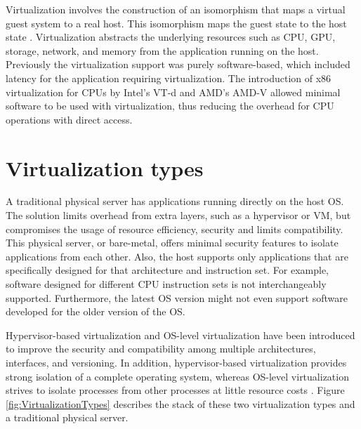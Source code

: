 Virtualization involves the construction of an isomorphism that maps a virtual guest system to a real host. This isomorphism maps the guest state to the host state \cite{Xing2012}. Virtualization abstracts the underlying resources such as CPU, GPU, storage, network, and memory from the application running on the host. Previously the virtualization support was purely software-based, which included latency for the application requiring virtualization. The introduction of x86 virtualization for CPUs by Intel's VT-d and AMD's AMD-V allowed minimal software to be used with virtualization, thus reducing the overhead for CPU operations with direct access.

\section{Virtualization types}

A traditional physical server has applications running directly on the host OS. The solution limits overhead from extra layers, such as a hypervisor or VM, but compromises the usage of resource efficiency, security and limits compatibility. This physical server, or bare-metal, offers minimal security features to isolate applications from each other. Also, the host supports only applications that are specifically designed for that architecture and instruction set. For example, software designed for different CPU instruction sets is not interchangeably supported. Furthermore, the latest OS version might not even support software developed for the older version of the OS.

Hypervisor-based virtualization and OS-level virtualization have been introduced to improve the security and compatibility among multiple architectures, interfaces, and versioning. In addition, hypervisor-based virtualization provides strong isolation of a complete operating system, whereas OS-level virtualization strives to isolate processes from other processes at little resource costs \cite{Eder2016}. Figure \ref{fig:VirtualizationTypes} describes the stack of these two virtualization types and a traditional physical server.

